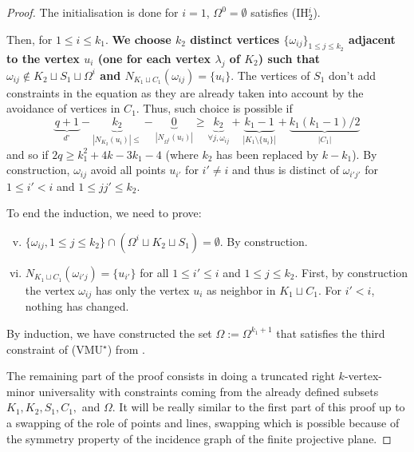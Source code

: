 \documentclass[a4paper,UKenglish,cleveref, autoref, thm-restate]{arxiv}
\newcommand{\ls}{\leqslant}
\newcommand{\gs}{\geqslant}
\begin{document}
\begin{proof}
        The initialisation is done for $i=1$, $\Omega^{0} = \emptyset$ satisfies (IH$_2^{i}$). 
        
        Then, for $1 \ls i \ls k_1$. \textbf{We choose $k_2$ distinct vertices $\{\omega_{ij}\}_{1 \ls j \ls k_2}$ adjacent to the vertex $u_i$ (one for each vertex $\lambda_j$ of $K_2$) such that  $\omega_{ij} \notin K_2 \sqcup S_1 \sqcup \Omega^i$ and $N_{K_1 \sqcup C_1}(\omega_{ij}) = \{u_i\}$}. The vertices of $S_1$ don't add constraints in the equation as they are already taken into account by the avoidance of vertices in $C_1$. Thus, such choice is possible if
        $$\underbrace{q+1}_{d^\circ} - \underbrace{k_2}_{|N_{K_2}(u_i)|\ls} - \underbrace{0}_{|N_{\Omega^i}(u_i)|} \gs \underbrace{k_2}_{\forall j, \omega_{ij}} + \underbrace{k_1 - 1}_{|K_1 \setminus \{u_i\}|} + \underbrace{k_1(k_1-1)/2}_{|C_1|}$$ 
        and so if $2q \gs k_1^2+4k-3k_1-4$ (where $k_2$ has been replaced by $k-k_1$). By construction, $\omega_{ij}$ avoid all points $u_{i'}$ for $i' \neq i$ and thus is distinct of $\omega_{i'j'}$ for $1 \ls i' < i$ and $1 \ls j j' \ls k_2$.
        
        To end the induction, we need to prove:
        \begin{enumerate}[(i)]
            \setcounter{enumi}{4}
            \item $ \{\omega_{ij}, 1\ls j \ls k_2\} \cap (\Omega^i \sqcup K_2 \sqcup S_1) = \emptyset$. By construction.
            \item $N_{K_1 \sqcup C_1}(\omega_{i'j}) = \{u_{i'}\}$ for all $1 \ls i' \ls i$ and $1 \ls j \ls k_2$. First, by construction the vertex $\omega_{ij}$ has only the vertex $u_i$ as neighbor in $K_1 \sqcup C_1$. For $i' < i$, nothing has changed. 
        \end{enumerate}
        
        By induction, we have constructed the set $\Omega := \Omega^{k_1+1}$ that satisfies the third constraint of (VMU$^\star$) from .
        
        \bigskip The remaining part of the proof consists in doing a truncated right $k$-vertex-minor universality with constraints coming from the already defined subsets $K_1, K_2, S_1, C_1, $ and $\Omega$. It will be really similar to the first part of this proof up to a swapping of the role of points and lines, swapping which is possible because of the symmetry property of the incidence graph of the finite projective plane. 


\end{proof}
\end{document}
